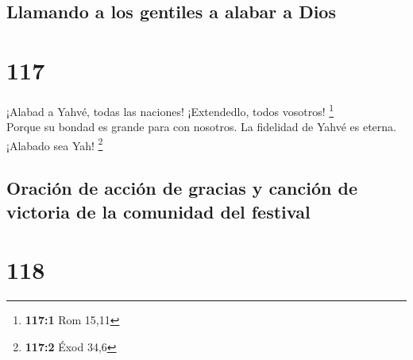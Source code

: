 \hypertarget{llamando-a-los-gentiles-a-alabar-a-dios}{%
\subsection{Llamando a los gentiles a alabar a
Dios}\label{llamando-a-los-gentiles-a-alabar-a-dios}}

\hypertarget{section-114}{%
\section{117}\label{section-114}}

 ¡Alabad a Yahvé, todas las naciones! ¡Extendedlo, todos
vosotros! \footnote{\textbf{117:1} Rom 15,11}\\
 Porque su bondad es grande para con nosotros. La
fidelidad de Yahvé es eterna. ¡Alabado sea Yah! \footnote{\textbf{117:2}
  Éxod 34,6}

\hypertarget{oraciuxf3n-de-acciuxf3n-de-gracias-y-canciuxf3n-de-victoria-de-la-comunidad-del-festival}{%
\subsection{Oración de acción de gracias y canción de victoria de la
comunidad del
festival}\label{oraciuxf3n-de-acciuxf3n-de-gracias-y-canciuxf3n-de-victoria-de-la-comunidad-del-festival}}

\hypertarget{section-115}{%
\section{118}\label{section-115}}

